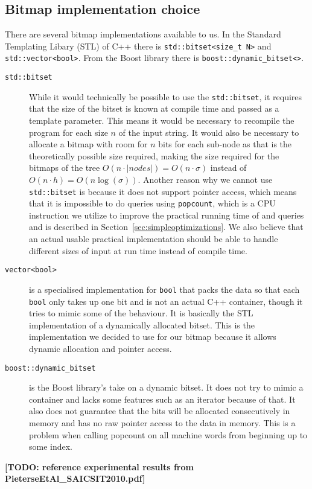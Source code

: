 \subsection{Bitmap implementation choice}
There are several bitmap implementations available to us. In the Standard Templating Libary (STL) of C++ there is \texttt{std::bitset<size\_t N>} and \texttt{std::vector<bool>}. From the Boost library there is \texttt{boost::dynamic\_bitset<>}.
\begin{description}
\item[\texttt{std::bitset}] While it would technically be possible to use the \texttt{std::bitset}, it requires that the size of the bitset is known at compile time and passed as a template parameter. This means it would be necessary to recompile the program for each size $n$ of the input string. 
It would also be necessary to allocate a bitmap with room for $n$ bits for each sub-node as that is the theoretically possible size required, making the size required for the bitmaps of the tree $O(n \cdot |nodes|) = O(n \cdot \sigma)$ instead of $O(n \cdot h) = O(n\log(\sigma))$.
Another reason why we cannot use \texttt{std::bitset} is because it does not support pointer access, which means that it is impossible to do queries using \texttt{popcount}, which is a CPU instruction we utilize to improve the practical running time of  and  queries and is described in Section~\ref{sec:simpleoptimizations}.
We also believe that an actual usable practical implementation should be able to handle different sizes of input at run time instead of compile time. 

\item[\texttt{vector<bool>}] is a specialised implementation for \texttt{bool} that packs the data so that each \texttt{bool} only takes up one bit and is not an actual C++ container, though it tries to mimic some of the behaviour. 
It is basically the STL implementation of a dynamically allocated bitset. This is the implementation we decided to use for our bitmap because it allows dynamic allocation and pointer access.

\item[\texttt{boost::dynamic\_bitset}] is the Boost library's take on a dynamic bitset. 
It does not try to mimic a container and lacks some features such as an iterator because of that. 
It also does not guarantee that the bits will be allocated consecutively in memory and has no raw pointer access to the data in memory. 
This is a problem when calling popcount on all machine words from beginning up to some index.
\end{description}

\textbf{[TODO: reference experimental results from PieterseEtAl\_SAICSIT2010.pdf]}

